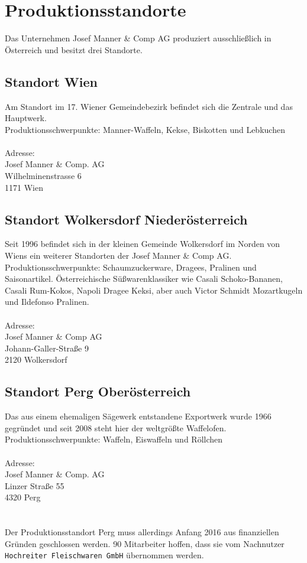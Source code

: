 \section{Produktionsstandorte}
Das Unternehmen Josef Manner \& Comp AG produziert ausschließlich in Österreich und besitzt drei Standorte.

\subsection{Standort Wien}
Am Standort im 17. Wiener Gemeindebezirk befindet sich die Zentrale und das Hauptwerk.\\
Produktionsschwerpunkte: Manner-Waffeln, Kekse, Biskotten und Lebkuchen\\
\\
Adresse:\\
Josef Manner \& Comp. AG\\
Wilhelminenstrasse 6\\
1171 Wien

\subsection{Standort Wolkersdorf Niederösterreich}
Seit 1996 befindet sich in der kleinen Gemeinde Wolkersdorf im Norden von Wiens ein weiterer Standorten der Josef Manner \& Comp AG.\\
Produktionsschwerpunkte: Schaumzuckerware, Dragees, Pralinen und Saisonartikel. Österreichische Süßwarenklassiker wie Casali Schoko-Bananen, Casali Rum-Kokos, Napoli Dragee Keksi, aber auch Victor Schmidt Mozartkugeln und Ildefonso Pralinen.\\
\\
Adresse:\\
Josef Manner \& Comp AG\\
Johann-Galler-Straße 9\\
2120 Wolkersdorf

\subsection{Standort Perg Oberösterreich}
Das aus einem ehemaligen Sägewerk entstandene Exportwerk wurde 1966 gegründet und seit 2008 steht hier der weltgrößte Waffelofen.\\
Produktionsschwerpunkte:  Waffeln, Eiswaffeln und Röllchen\\
\\
Adresse:\\
Josef Manner \& Comp. AG\\
Linzer Straße 55\\
4320 Perg\\
\cite{josef_manner_unternehmen}
\\
\\
Der Produktionsstandort Perg muss allerdings Anfang 2016 aus finanziellen Gründen geschlossen werden. 90 Mitarbeiter hoffen, dass sie vom Nachnutzer \texttt{Hochreiter Fleischwaren GmbH} übernommen werden. \cite{presse_manner}
